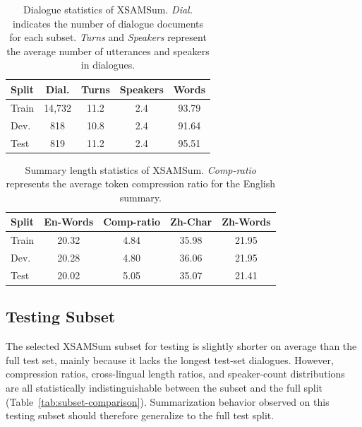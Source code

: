 \documentclass[11pt]{article}
\begin{document}
\begin{table}[H]
\centering
\footnotesize
\setlength{\tabcolsep}{4pt}
\begin{tabular}{lcccc}
\hline
\textbf{Split} & \textbf{Dial.} & \textbf{Turns} & \textbf{Speakers} & \textbf{Words} \\ 
\hline
Train & 14{,}732 & 11.2 & 2.4 & 93.79 \\
Dev. & 818 & 10.8 & 2.4 & 91.64 \\
Test & 819 & 11.2 & 2.4 & 95.51 \\

\hline
\end{tabular}
\caption{Dialogue statistics of XSAMSum. \textit{Dial.} indicates the number of dialogue documents for each subset. \textit{Turns} and \textit{Speakers} represent the average
number of utterances and speakers in dialogues\cite{wang-etal-2022-clidsum}.}
\label{tab:xsamsum-dialogue}
\end{table}

\begin{table}[H]
\centering
\footnotesize
\setlength{\tabcolsep}{4pt}
\begin{tabular}{lcccc}
\hline
\textbf{Split} & \textbf{En-Words} & \textbf{Comp-ratio} & \textbf{Zh-Char} & \textbf{Zh-Words} \\ 
\hline
Train & 20.32 & 4.84 & 35.98 & 21.95 \\
Dev. & 20.28 & 4.80 & 36.06 & 21.95 \\
Test & 20.02 & 5.05 & 35.07 & 21.41 \\

\hline
\end{tabular}
\caption{Summary length statistics of XSAMSum. \textit{Comp-ratio} represents the average token compression ratio for the English summary.}
\label{tab:xsamsum-summary}
\end{table}

\subsection{Testing Subset}

The selected XSAMSum subset for testing is slightly shorter on average than the full test set, mainly because it lacks the longest test-set dialogues. However, compression ratios, cross-lingual length ratios, and speaker-count distributions are all statistically indistinguishable between the subset and the full split (Table~\ref{tab:subset-comparison}). Summarization behavior observed on this testing subset should therefore generalize to the full test split.
\end{document}
